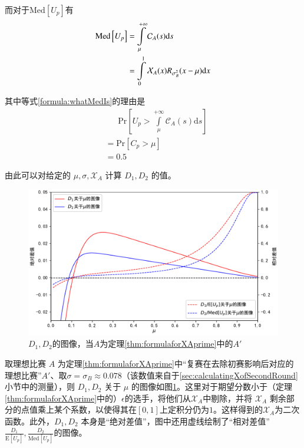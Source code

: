             而对于$\mathrm{Med}\left[U_p\right]$有
            \begin{align}
                \mathrm{Med}\left[U_p\right]
                &=\int\limits_{\mu}^{+\infty} \mathcal{C}_A(s)\mathrm{d}s \label{formula:whatMedIs}\\
                &=\int\limits_0^1 \mathcal{X}_A(x)R_{\sigma_B^2}(x-\mu) \mathrm{d}x \notag
            \end{align}

            其中等式\eqref{formula:whatMedIs}的理由是
            \begin{align*}
            &\phantom{=\ }\mathrm{Pr}\left[U_p>\int\limits_{\mu}^{+\infty} \mathcal{C}_A(s)\mathrm{d}s\right] \\
            &=\mathrm{Pr}\left[C_p>\mu\right] \\
            &=0.5
            \end{align*}

            由此可以对给定的 $\mu,\sigma,\mathcal{X}_A$ 计算 $D_1,D_2$ 的值。

            \vspace{1.5ex}

            \begin{figure}
                \centering
                \includegraphics[width=\textwidth]{fig/plottingD_1D_2.pdf}
                \caption{$D_1,D_2$的图像，当$A$为定理\ref{thm:formulaforXAprime}中的$A'$}
                \label{fig:plottingD_1D_2forAprime}
            \end{figure}

            取理想比赛 $A$ 为定理\ref{thm:formulaforXAprime}中“复赛在去除初赛影响后对应的理想比赛”$A'$、取$\sigma=\sigma_B\approx 0.078$（该数值来自于\ref{sec:calculatingXofSecondRound}小节中的测量），则 $D_1,D_2$ 关于 $\mu$ 的图像如图\ref{fig:plottingD_1D_2forAprime}。这里对于期望分数小于（定理\ref{thm:formulaforXAprime}中的）$\epsilon$的选手，将他们从$\mathcal{X}_A$中剔除，并将 $\mathcal{X}_A$ 剩余部分的点值乘上某个系数，以使得其在$[0,1]$上定积分仍为$1$。这样得到的$\mathcal{X}_A$为二次函数。此外，$D_1,D_2$ 本身是“绝对差值”，图中还用虚线绘制了“相对差值”$\frac{D_1}{\mathrm{E}\left[U_p\right]},\frac{D_2}{\mathrm{Med}\left[U_p\right]}$的图像。

